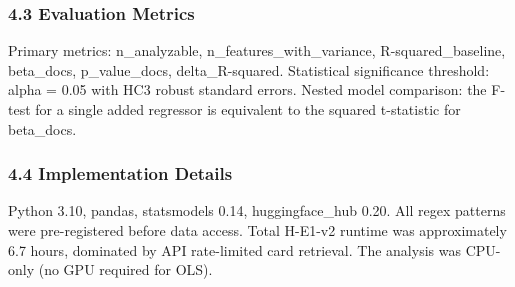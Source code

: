 \subsubsection{4.3 Evaluation Metrics}

Primary metrics: n\_analyzable, n\_features\_with\_variance, R-squared\_baseline, beta\_docs, p\_value\_docs, delta\_R-squared. Statistical significance threshold: alpha = 0.05 with HC3 robust standard errors. Nested model comparison: the F-test for a single added regressor is equivalent to the squared t-statistic for beta\_docs.

\subsubsection{4.4 Implementation Details}

Python 3.10, pandas, statsmodels 0.14, huggingface\_hub 0.20. All regex patterns were pre-registered before data access. Total H-E1-v2 runtime was approximately 6.7 hours, dominated by API rate-limited card retrieval. The analysis was CPU-only (no GPU required for OLS).
